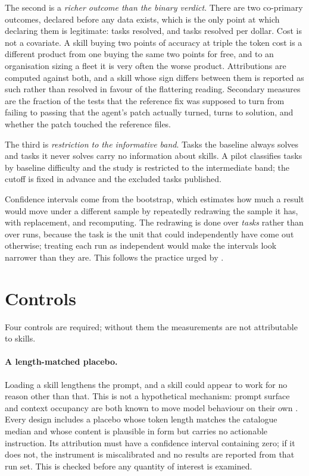 \documentclass[11pt]{article}
\theoremstyle{plain}
\theoremstyle{definition}
\theoremstyle{remark}
\begin{document}
The second is a \emph{richer outcome than the binary verdict}. There are two co-primary outcomes, declared before any data exists, which is the only point at which declaring them is legitimate: tasks resolved, and tasks resolved per dollar. Cost is not a covariate. A skill buying two points of accuracy at triple the token cost is a different product from one buying the same two points for free, and to an organisation sizing a fleet it is very often the worse product. Attributions are computed against both, and a skill whose sign differs between them is reported as such rather than resolved in favour of the flattering reading. Secondary measures are the fraction of the tests that the reference fix was supposed to turn from failing to passing that the agent's patch actually turned, turns to solution, and whether the patch touched the reference files.

The third is \emph{restriction to the informative band}. Tasks the baseline always solves and tasks it never solves carry no information about skills. A pilot classifies tasks by baseline difficulty and the study is restricted to the intermediate band; the cutoff is fixed in advance and the excluded tasks published.

Confidence intervals come from the bootstrap, which estimates how much a result would move under a different sample by repeatedly redrawing the sample it has, with replacement, and recomputing. The redrawing is done over \emph{tasks} rather than over runs, because the task is the unit that could independently have come out otherwise; treating each run as independent would make the intervals look narrower than they are. This follows the practice urged by \cite{bouthillier,agarwal}.

\section{Controls}
\label{sec:controls}

Four controls are required; without them the measurements are not attributable to skills.

\paragraph{A length-matched placebo.} Loading a skill lengthens the prompt, and a skill could appear to work for no reason other than that. This is not a hypothetical mechanism: prompt surface and context occupancy are both known to move model behaviour on their own \cite{sclar,lostmiddle}. Every design includes a placebo whose token length matches the catalogue median and whose content is plausible in form but carries no actionable instruction. Its attribution must have a confidence interval containing zero; if it does not, the instrument is miscalibrated and no results are reported from that run set. This is checked before any quantity of interest is examined.
\end{document}
